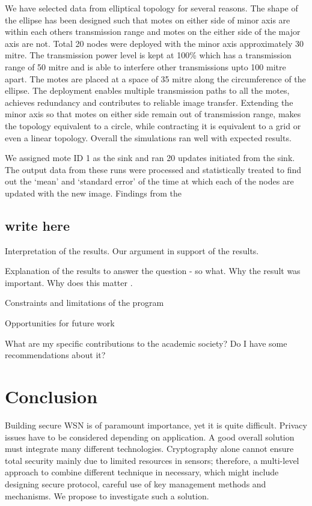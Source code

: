 \documentclass[conference,final]{IEEEtran}
\begin{document}
We have selected data from elliptical topology for several reasons.
The shape of the ellipse has been designed such that motes on either side of minor axis are within each others transmission range and motes on the either side of the major axis are not.
Total 20 nodes were deployed with the minor axis approximately 30 mitre.
The transmission power level is kept at 100\% which has a  transmission range of 50 mitre and is able to interfere other transmissions upto 100 mitre apart.
The motes are placed at a space of 35 mitre along the circumference of the ellipse. 
The deployment enables multiple transmission paths to all the motes, achieves redundancy and contributes to reliable image transfer. 
Extending the minor axis so that motes on either side remain out of transmission range, makes the topology equivalent to a circle, while contracting it is equivalent to a grid or even a linear topology.
Overall the simulations ran well with expected results.

We assigned mote ID 1 as the sink and ran 20 updates initiated from the sink.
The output data from these runs were processed and statistically treated to find out the `mean' and `standard error' of the  time at which each of the nodes are updated with the new image.
Findings from the 

\subsection{write here}

Interpretation of the results.
Our argument in support of the results.

Explanation of the results to answer the question - so what.
Why the result was important.
Why does this matter .

Constraints and limitations of the program

Opportunities for future work

What are my specific contributions to the academic society?
Do I have some recommendations about it?


\section{Conclusion}

Building secure WSN is of paramount importance, yet it is quite difficult. Privacy issues have to be considered depending on application. A good overall solution must integrate many different technologies. Cryptography alone cannot ensure total security mainly due to limited resources in sensors; therefore, a multi-level approach to combine different technique in necessary, which might  include designing secure protocol, careful use of key management methods and mechanisms. We propose to investigate such a solution.
\end{document}
